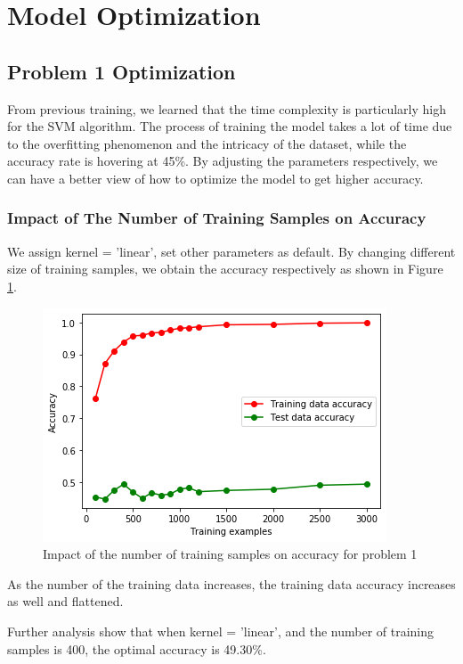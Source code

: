 \clearpage
\section{Model Optimization}

\subsection{Problem 1 Optimization}
From previous training, we learned that the time complexity is particularly high for the SVM algorithm. The process of training the model takes a lot of time due to the overfitting phenomenon and the intricacy of the dataset, while the accuracy rate is hovering at 45\%. By adjusting the parameters respectively, we can have a better view of how to optimize the model to get higher accuracy.
\subsubsection{Impact of The Number of Training Samples on Accuracy}
We assign kernel = 'linear', set other parameters as default. By changing different size of training samples, we obtain the accuracy respectively as shown in Figure \ref{Impact of the number of training samples on accuracy for problem 1}.
\begin{figure}[h!]
    \centering
    \includegraphics[scale=0.6]{figures/Impact of the number of training samples on accuracy for problem 1.png}
    \caption{Impact of the number of training samples on accuracy for problem 1}
    \label{Impact of the number of training samples on accuracy for problem 1}
\end{figure}

As the number of the training data increases, the training data accuracy increases as well and flattened.


Further analysis show that when kernel = 'linear', and the number of training samples is 400, the optimal accuracy is 49.30\%.
